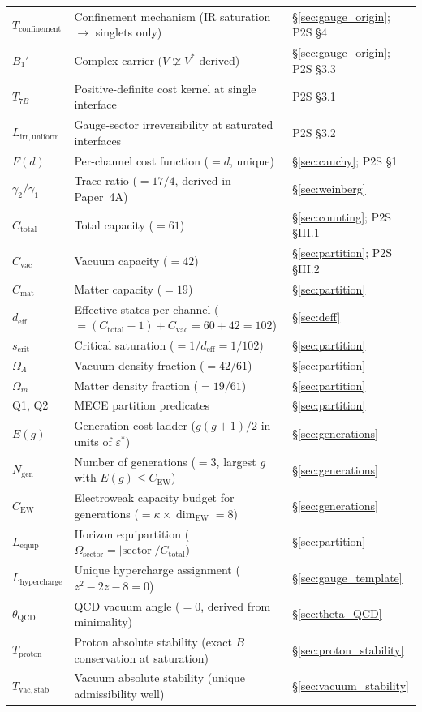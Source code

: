 \documentclass[11pt]{article}
\begin{document}
\begin{center}
\begin{tabular}{lp{8.5cm}l}
$T_{\mathrm{confinement}}$ & Confinement mechanism (IR saturation $\to$ singlets only) & \S\ref{sec:gauge_origin}; P2S \S4 \\
$B_1'$ & Complex carrier ($V \not\cong V^*$ derived) & \S\ref{sec:gauge_origin}; P2S \S3.3 \\
$T_{7B}$ & Positive-definite cost kernel at single interface & P2S \S3.1 \\
$L_{\mathrm{irr,uniform}}$ & Gauge-sector irreversibility at saturated interfaces & P2S \S3.2 \\
$F(d)$ & Per-channel cost function ($= d$, unique) & \S\ref{sec:cauchy}; P2S \S1 \\
$\gamma_2/\gamma_1$ & Trace ratio ($= 17/4$, derived in Paper~4A) & \S\ref{sec:weinberg} \\
$C_{\mathrm{total}}$ & Total capacity ($= 61$) & \S\ref{sec:counting}; P2S \S III.1 \\
$C_{\mathrm{vac}}$ & Vacuum capacity ($= 42$) & \S\ref{sec:partition}; P2S \S III.2 \\
$C_{\mathrm{mat}}$ & Matter capacity ($= 19$) & \S\ref{sec:partition} \\
$d_{\mathrm{eff}}$ & Effective states per channel ($= (C_{\mathrm{total}}-1) + C_{\mathrm{vac}} = 60 + 42 = 102$) & \S\ref{sec:deff} \\
$s_{\mathrm{crit}}$ & Critical saturation ($= 1/d_{\mathrm{eff}} = 1/102$) & \S\ref{sec:partition} \\
$\Omega_\Lambda$ & Vacuum density fraction ($= 42/61$) & \S\ref{sec:partition} \\
$\Omega_m$ & Matter density fraction ($= 19/61$) & \S\ref{sec:partition} \\
Q1, Q2 & MECE partition predicates & \S\ref{sec:partition} \\
$E(g)$ & Generation cost ladder ($g(g+1)/2$ in units of $\varepsilon^*$) & \S\ref{sec:generations} \\
$N_{\mathrm{gen}}$ & Number of generations ($= 3$, largest $g$ with $E(g) \le C_{\mathrm{EW}}$) & \S\ref{sec:generations} \\
$C_{\mathrm{EW}}$ & Electroweak capacity budget for generations ($= \kappa \times \dim_{\mathrm{EW}} = 8$) & \S\ref{sec:generations} \\
$L_{\mathrm{equip}}$ & Horizon equipartition ($\Omega_{\mathrm{sector}} = |\mathrm{sector}|/C_{\mathrm{total}}$) & \S\ref{sec:partition} \\
$L_{\mathrm{hypercharge}}$ & Unique hypercharge assignment ($z^2 - 2z - 8 = 0$) & \S\ref{sec:gauge_template} \\
$\theta_{\mathrm{QCD}}$ & QCD vacuum angle ($= 0$, derived from minimality) & \S\ref{sec:theta_QCD} \\
$T_{\mathrm{proton}}$ & Proton absolute stability (exact $B$ conservation at saturation) & \S\ref{sec:proton_stability} \\
$T_{\mathrm{vac,stab}}$ & Vacuum absolute stability (unique admissibility well) & \S\ref{sec:vacuum_stability} \\
\bottomrule
\end{tabular}
\end{center}
\end{document}
